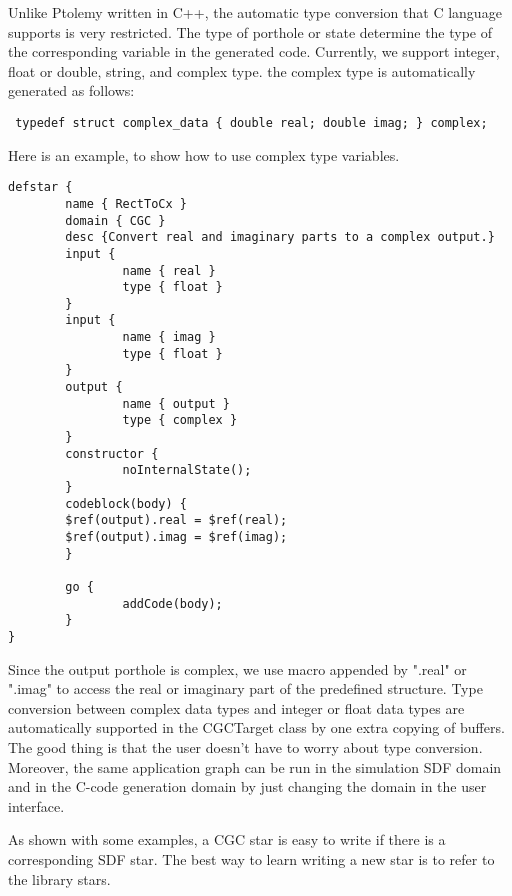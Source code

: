 Unlike Ptolemy written in C++, the automatic 
type conversion that C language supports is very restricted.
The type of porthole or state determine the type of the
corresponding variable in the generated code. Currently, we
support integer, float or double, string, and complex type.
the complex type is automatically generated as follows:

\begin{verbatim}
 typedef struct complex_data { double real; double imag; } complex;
\end{verbatim}

Here is an example,
to show how to use complex type variables.

\begin{verbatim}
defstar {
        name { RectToCx }
        domain { CGC }
        desc {Convert real and imaginary parts to a complex output.}
        input {
                name { real }
                type { float }
        }
        input {
                name { imag }
                type { float }
        }
        output {
                name { output }
                type { complex }
        }
        constructor {
                noInternalState();
        }
        codeblock(body) {
        $ref(output).real = $ref(real);
        $ref(output).imag = $ref(imag);
        }
        
        go {
                addCode(body);
        }
}
\end{verbatim}

Since the output porthole is complex, we use
macro appended by ".real" or ".imag" to access the real or imaginary
part of the predefined  structure.
Type conversion between complex data types and integer or float data
types are automatically supported in the CGCTarget class by one extra
copying of buffers. The good thing is that the user doesn't have to
worry about type conversion. Moreover, the same application graph
can be run in the simulation SDF domain and in the C-code
generation domain by just changing the domain in the user interface.

As shown with some examples, a CGC star is easy to write if there
is a corresponding SDF star. The best way to learn writing a new
star is to refer to the library stars.

